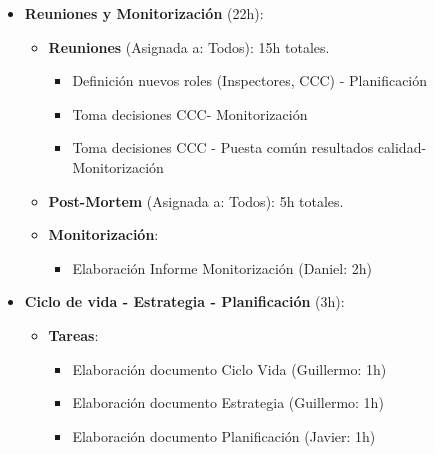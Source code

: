 \documentclass[12pt,a4paper,titlepage]{article}
\begin{document}
\begin{itemize}
    \item \textbf{Reuniones y Monitorización} (22h):
    \begin{itemize}
        \item \textbf{Reuniones} (Asignada a: Todos): 15h totales.
        \begin{itemize}
            \item Definición nuevos roles (Inspectores, CCC) - Planificación
            \item Toma decisiones CCC- Monitorización
            \item Toma decisiones CCC - Puesta común resultados calidad-Monitorización
        \end{itemize}
        \item \textbf{Post-Mortem} (Asignada a: Todos): 5h totales.
        \item \textbf{Monitorización}:
        \begin{itemize}
            \item Elaboración Informe Monitorización (Daniel: 2h)
        \end{itemize}
    \end{itemize}

    \item \textbf{Ciclo de vida - Estrategia - Planificación} (3h):
    \begin{itemize}
        \item \textbf{Tareas}:
        \begin{itemize}
            \item Elaboración documento Ciclo Vida (Guillermo: 1h)
            \item Elaboración documento Estrategia (Guillermo: 1h)
            \item Elaboración documento Planificación (Javier: 1h)
        \end{itemize}
    \end{itemize}


\end{itemize}
\end{document}
